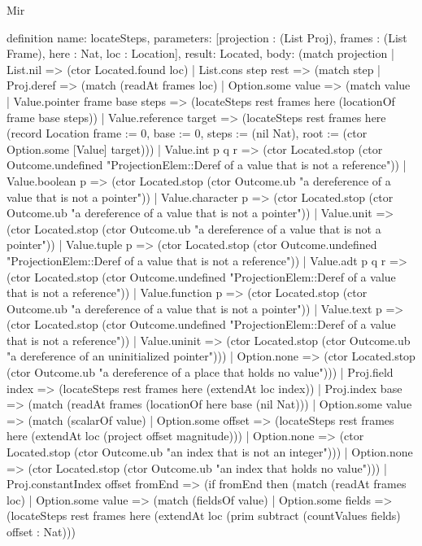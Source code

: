 \begin{lexlean}{Mir}
\begin{semanticmodule}
definition{
  name: locateSteps,
  parameters: [projection : (List Proj), frames : (List Frame), here : Nat, loc : Location],
  result: Located,
  body: (match projection
    | List.nil => (ctor Located.found loc)
    | List.cons step rest => (match step
      | Proj.deref => (match (readAt frames loc)
        | Option.some value => (match value
          | Value.pointer frame base steps => (locateSteps rest frames here (locationOf frame base steps))
          | Value.reference target => (locateSteps rest frames here (record Location {frame := 0, base := 0, steps := (nil Nat), root := (ctor Option.some [Value] target)}))
          | Value.int p q r => (ctor Located.stop (ctor Outcome.undefined "ProjectionElem::Deref of a value that is not a reference"))
          | Value.boolean p => (ctor Located.stop (ctor Outcome.ub "a dereference of a value that is not a pointer"))
          | Value.character p => (ctor Located.stop (ctor Outcome.ub "a dereference of a value that is not a pointer"))
          | Value.unit => (ctor Located.stop (ctor Outcome.ub "a dereference of a value that is not a pointer"))
          | Value.tuple p => (ctor Located.stop (ctor Outcome.undefined "ProjectionElem::Deref of a value that is not a reference"))
          | Value.adt p q r => (ctor Located.stop (ctor Outcome.undefined "ProjectionElem::Deref of a value that is not a reference"))
          | Value.function p => (ctor Located.stop (ctor Outcome.ub "a dereference of a value that is not a pointer"))
          | Value.text p => (ctor Located.stop (ctor Outcome.undefined "ProjectionElem::Deref of a value that is not a reference"))
          | Value.uninit => (ctor Located.stop (ctor Outcome.ub "a dereference of an uninitialized pointer")))
        | Option.none => (ctor Located.stop (ctor Outcome.ub "a dereference of a place that holds no value")))
      | Proj.field index => (locateSteps rest frames here (extendAt loc index))
      | Proj.index base => (match (readAt frames (locationOf here base (nil Nat)))
        | Option.some value => (match (scalarOf value)
          | Option.some offset => (locateSteps rest frames here (extendAt loc (project offset magnitude)))
          | Option.none => (ctor Located.stop (ctor Outcome.ub "an index that is not an integer")))
        | Option.none => (ctor Located.stop (ctor Outcome.ub "an index that holds no value")))
      | Proj.constantIndex offset fromEnd => (if fromEnd then (match (readAt frames loc)
        | Option.some value => (match (fieldsOf value)
          | Option.some fields => (locateSteps rest frames here (extendAt loc (prim subtract (countValues fields) offset : Nat)))
}
\end{semanticmodule}
\end{lexlean}
